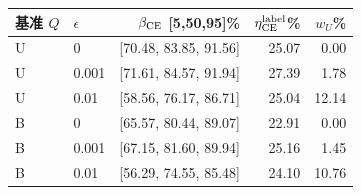 \begin{tabular}{llrrr}
\toprule
基准 $Q$ & $\epsilon$ & $\beta_{\rm CE}$ [5,50,95]\% & $\eta_{\rm CE}^{\rm label}$\% & $w_U$\% \\
\midrule
U & 0 & [70.48, 83.85, 91.56] & 25.07 & 0.00 \\
U & 0.001 & [71.61, 84.57, 91.94] & 27.39 & 1.78 \\
U & 0.01 & [58.56, 76.17, 86.71] & 25.04 & 12.14 \\
B & 0 & [65.57, 80.44, 89.07] & 22.91 & 0.00 \\
B & 0.001 & [67.15, 81.60, 89.94] & 25.16 & 1.45 \\
B & 0.01 & [56.29, 74.55, 85.48] & 24.10 & 10.76 \\
\bottomrule
\end{tabular}
